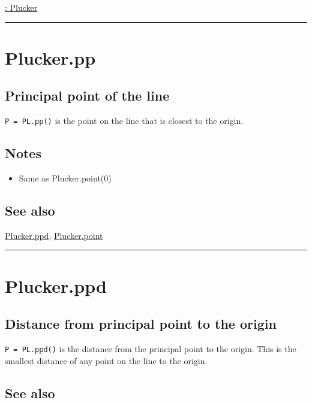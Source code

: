 \hyperlink{: Plucker}{\color{blue} : Plucker}

\vspace{1.5ex}\hrule

\hypertarget{Plucker.pp}{\section*{Plucker.pp}}
\subsection*{Principal point of the line}


\texttt{P = PL.pp()} is the point on the line that is closest to the origin.


\subsection*{Notes}
\begin{itemize}
  \item Same as Plucker.point(0)
\end{itemize}

\subsection*{See also}


\hyperlink{Plucker.ppd}{\color{blue} Plucker.ppd}, \hyperlink{Plucker.point}{\color{blue} Plucker.point}

\vspace{1.5ex}\hrule

\hypertarget{Plucker.ppd}{\section*{Plucker.ppd}}
\subsection*{Distance from principal point to the origin}


\texttt{P = PL.ppd()} is the distance from the principal point to the origin.
This is the smallest distance of any point on the line
to the origin.


\subsection*{See also}


